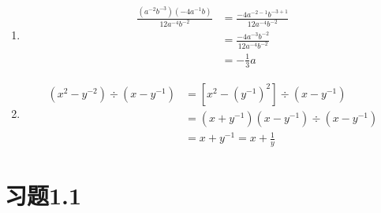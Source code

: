     
\begin{example}
\begin{enumerate}
    \item \[\begin{split}
        \frac{\left(a^{-2} b^{-3}\right)\left(-4 a^{-1} b\right)}{12 a^{-4} b^{-2}}&=\frac{-4 a^{-2-1} b^{-3+1}}{12 a^{-4} b^{-2}} \\
    &=\frac{-4 a^{-3} b^{-2}}{12 a^{-4} b^{-2}}\\
    &=-\frac{1}{3} a
    \end{split}\]
    \item \[\begin{split}
        \left(x^{2}-y^{-2}\right)\div\left(x-y^{-1}\right) 
    &=\left[x^{2}-\left(y^{-1}\right)^{2}\right] \div\left(x-y^{-1}\right) \\
    &=\left(x+y^{-1}\right)\left(x-y^{-1}\right)\div \left(x-y^{-1}\right) \\
    &=x+y^{-1}=x+\frac{1}{y}
    \end{split}\]
\end{enumerate}
\end{example}


\section*{习题1.1}

